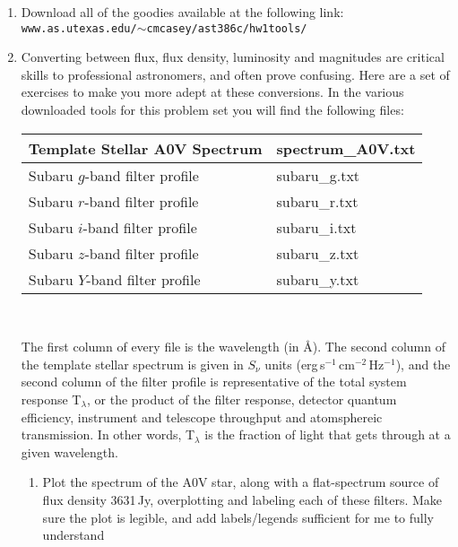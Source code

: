 \documentclass[11pt]{article}
\begin{document}
\begin{enumerate}
\item Download all of the goodies available at the following link:\\
  {\tt www.as.utexas.edu/$\sim$cmcasey/ast386c/hw1tools/}
\item Converting between flux, flux density, luminosity and magnitudes
  are critical skills to professional astronomers, and often prove
  confusing.  Here are a set of exercises to make you more adept at
  these conversions.  In the various downloaded tools for this problem
  set you will find the following files:
  \begin{center}
\vspace{-0.5cm}
  \begin{tabular}{|l|l|}
    \hline
    Template Stellar A0V Spectrum & spectrum\_A0V.txt \\
    \hline
    Subaru $g$-band filter profile & subaru\_g.txt \\
    \hline
    Subaru $r$-band filter profile & subaru\_r.txt \\
    \hline
    Subaru $i$-band filter profile & subaru\_i.txt \\
    \hline
    Subaru $z$-band filter profile & subaru\_z.txt \\
    \hline
    Subaru $Y$-band filter profile & subaru\_y.txt \\
    \hline
  \end{tabular}\\
  \end{center}
  The first column of every file is the wavelength (in \AA).  The
  second column of the template stellar spectrum is given in $S_{\nu}$
  units (erg\,s$^{-1}$\,cm$^{-2}$\,Hz$^{-1}$), and the second column
  of the filter profile is representative of the total system response
  T$_\lambda$, or the product of the filter response, detector quantum
  efficiency, instrument and telescope throughput and atomsphereic
  transmission.  In other words, T$_\lambda$ is the fraction of light
  that gets through at a given wavelength.
  \begin{enumerate}
    \item Plot the spectrum of the A0V star, along with a
      flat-spectrum source of flux density 3631\,Jy, overplotting and
      labeling each of these filters.  Make sure the plot is legible,
      and add labels/legends sufficient for me to fully understand

\end{enumerate}
\end{enumerate}
\end{document}
